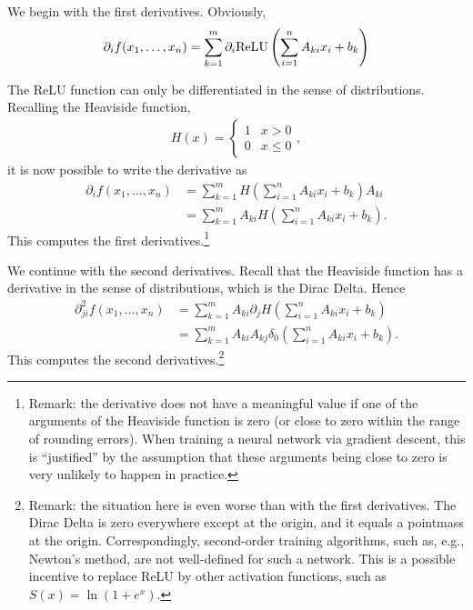\documentclass[11pt]{article}
\begin{document}
\begin{solution}
    We begin with the first derivatives. Obviously,
    \begin{align}
        \partial_{i} f(x_1,\dots,x_{n}) = \sum_{k=1}^{m} \partial_{i} {\mathrm{ReLU}}\left( \sum_{i=1}^{n} A_{ki} x_{i} + b_{k} \right)
    \end{align}
    
    The ReLU function can only be differentiated in the sense of distributions. Recalling the Heaviside function,
    \begin{align}
        H(x) = \begin{cases} 1 & x > 0 \\ 0 & x \leq 0 \end{cases},
    \end{align}
    it is now possible to write the derivative as 
    \begin{align}
        \partial_{i} f(x_1,\dots,x_{n}) 
        &= 
        \sum_{k=1}^{m} H\left( \sum_{i=1}^{n} A_{ki} x_{i} + b_{k}  \right) A_{ki} 
        \\&
        =
        \sum_{k=1}^{m} A_{ki} H\left( \sum_{i=1}^{n} A_{ki} x_{i} + b_{k}  \right)
        .
    \end{align}
    This computes the first derivatives.\footnote{Remark: the derivative does not have a meaningful value if one of the arguments of the Heaviside function is zero (or close to zero within the range of rounding errors). When training a neural network via gradient descent, this is ``justified'' by the assumption that these arguments being close to zero is very unlikely to happen in practice.}
    
    We continue with the second derivatives. Recall that the Heaviside function has a derivative in the sense of distributions, which is the Dirac Delta. Hence 
    \begin{align}
        \partial^{2}_{ji} f(x_1,\dots,x_{n}) 
        &
        = 
        \sum_{k=1}^{m} A_{ki} \partial_{j} H\left( \sum_{i=1}^{n} A_{ki} x_{i} + b_{k}  \right)
        \\&
        = 
        \sum_{k=1}^{m} A_{ki} A_{kj} \delta_{0}\left( \sum_{i=1}^{n} A_{ki} x_{i} + b_{k}  \right)
        .
    \end{align}
    This computes the second derivatives.\footnote{Remark: the situation here is even worse than with the first derivatives. The Dirac Delta is zero everywhere except at the origin, and it equals a pointmass at the origin. Correspondingly, second-order training algorithms, such as, e.g., Newton's method, are not well-defined for such a network. This is a possible incentive to replace ReLU by other activation functions, such as $S(x) = \ln( 1 + e^{x} )$.}
\end{solution}
\end{document}
